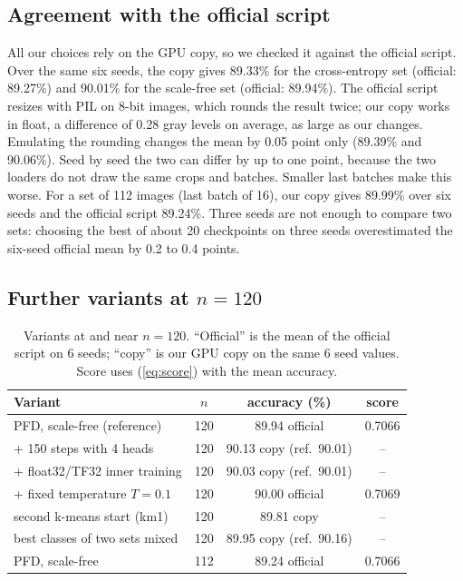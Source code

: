 \documentclass[journal]{IEEEtran}
\begin{document}
\subsection{Agreement with the official script}
\label{sec:fidelity}
All our choices rely on the GPU copy, so we checked it against the official script. Over the same six seeds, the
copy gives 89.33\% for the cross-entropy set (official: 89.27\%) and 90.01\% for the scale-free set (official:
89.94\%). The official script resizes with PIL on 8-bit images, which rounds the result twice; our copy works in
float, a difference of 0.28 gray levels on average, as large as our changes. Emulating the rounding changes the mean
by 0.05 point only (89.39\% and 90.06\%). Seed by seed the two can differ by up to one point, because the two loaders
do not draw the same crops and batches. Smaller last batches make this worse. For a set of 112 images (last batch of
16), our copy gives 89.99\% over six seeds and the official script 89.24\%. Three seeds are not enough to compare two
sets: choosing the best of about 20 checkpoints on three seeds overestimated the six-seed official mean by 0.2 to 0.4
points.

\subsection{Further variants at $n=120$}

\begin{table}[t]
\centering
\caption{Variants at and near $n=120$. ``Official'' is the mean of the official script on 6 seeds; ``copy'' is our
GPU copy on the same 6 seed values. Score uses (\ref{eq:score}) with the mean accuracy.}
\label{tab:variants}
\setlength{\tabcolsep}{4pt}
\begin{tabular}{lccc}
\toprule
Variant & $n$ & accuracy (\%) & score \\
\midrule
PFD, scale-free (reference) & 120 & 89.94 official & 0.7066 \\
\quad + 150 steps with 4 heads & 120 & 90.13 copy (ref.\ 90.01) & -- \\
\quad + float32/TF32 inner training & 120 & 90.03 copy (ref.\ 90.01) & -- \\
\quad + fixed temperature $T=0.1$ & 120 & 90.00 official & 0.7069 \\
second k-means start (km1) & 120 & 89.81 copy & -- \\
best classes of two sets mixed & 120 & 89.95 copy (ref.\ 90.16) & -- \\
PFD, scale-free & 112 & 89.24 official & 0.7066 \\
\bottomrule
\end{tabular}
\end{table}
\end{document}
